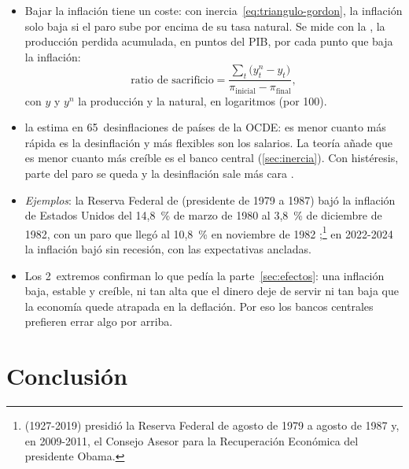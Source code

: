 \documentclass[11pt]{article}
\begin{document}
\begin{itemize}
\item Bajar la inflación tiene un coste: con inercia~\eqref{eq:triangulo-gordon}, la inflación solo baja si el paro sube por encima de su tasa natural. Se mide con la , la producción perdida acumulada, en puntos del PIB, por cada punto que baja la inflación:
  \begin{equation}\label{eq:ratio-sacrificio}
  \text{ratio de sacrificio}=\frac{\sum_t\big(y^n_t-y_t\big)}{\pi_{\text{inicial}}-\pi_{\text{final}}},
  \end{equation}
  con $y$ y $y^n$ la producción y la natural, en logaritmos (por 100).
\item \textcite{Ball1994Sacrifice} la estima en 65~desinflaciones de países de la OCDE: es menor cuanto más rápida es la desinflación y más flexibles son los salarios. La teoría añade que es menor cuanto más creíble es el banco central (\ref{sec:inercia}). Con histéresis, parte del paro se queda y la desinflación sale más cara .
\item \emph{Ejemplos}: la Reserva Federal de  (presidente de 1979 a 1987) bajó la inflación de Estados Unidos del 14,8~\% de marzo de 1980 al 3,8~\% de diciembre de 1982, con un paro que llegó al 10,8~\% en noviembre de 1982\nocite{BLS2026IPC,BLS2026UNRATE,FedHistory2026Volcker} ;\footnote{ (1927-2019) presidió la Reserva Federal de agosto de 1979 a agosto de 1987 y, en 2009-2011, el Consejo Asesor para la Recuperación Económica del presidente Obama\nocite{FedHistory2026Volcker}.} en 2022-2024 la inflación bajó sin recesión, con las expectativas ancladas\nocite{BernankeBlanchard2025What}.
\item Los 2~extremos confirman lo que pedía la parte~\ref{sec:efectos}: una inflación baja, estable y creíble, ni tan alta que el dinero deje de servir ni tan baja que la economía quede atrapada en la deflación. Por eso los bancos centrales prefieren errar algo por arriba.
\end{itemize}

\section*{Conclusión}
\end{document}
